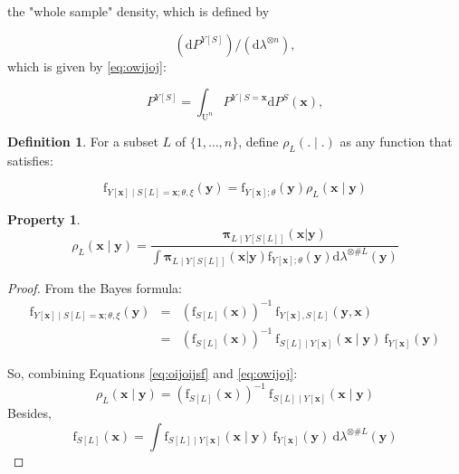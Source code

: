 \documentclass[12pt]{article}
\newtheorem{property}{Property}[section]
\theoremstyle{definition}
\newtheorem{definition}{Definition}[section]
\theoremstyle{remark}
\newcommand{\dominantY}{\lambda}
\newcommand{\sampledensity}{\mathbf{\pi}}
\newcommand{\parampop}{\theta}
\newcommand{\paramnuisance}{\xi}
\newcommand{\derive}{\mathrm{d}}
\newcommand{\density}{\mathrm{f}}
\newcommand{\Sample}{S}
\newcommand{\Pop}{\mathrm{U}}
\newcommand{\position}{\mathbf{x}}
\newcommand{\Sampleindex}{L}
\newcommand{\Signal}{Y}
\newcommand{\signal}{\mathbf{y}}
\begin{document}
the "whole sample" density, which is defined by


$$(\derive P^{\Signal[S]})/(\derive \dominantY^{\otimes n}),$$ which is given by \eqref{eq:owijoj}:

$$P^{\Signal[\Sample]}=\int_{\Pop^n} P^{\Signal\mid \Sample=\position}\derive P^\Sample(\position) ,$$


\begin{definition}
For a subset $\Sampleindex$ of $\{1,\ldots,n\}$,
define
$\rho_{\Sampleindex}(.\mid.)$ as any function that satisfies:

\begin{equation}
\density_{\Signal[\position]\mid\Sample[\Sampleindex]=\position ;\parampop,\paramnuisance}\left(\signal\right)=
    \density_{\Signal[\position];\parampop}\left(\signal\right)
    \rho_{\Sampleindex}\left(\position\mid  \signal\right)\label{eq:owijoj}
\end{equation}

\end{definition}


\begin{property}

\begin{equation}
\rho_{\Sampleindex}\left(\position \mid \signal\right)=
    \frac{\sampledensity_{\Sampleindex\mid \Signal[\Sample[\Sampleindex]]}\left(\position|\signal\right)}{\int
         \sampledensity_{\Sampleindex\mid \Signal[\Sample[\Sampleindex]]}\left(\position|\signal\right)
         \density_{\Signal[\position];\parampop}\left(\signal\right)
         \derive\dominantY^{\otimes\#\Sampleindex}\left(\signal\right)}
\end{equation}


\end{property}

\begin{proof}
From the Bayes formula:
\begin{eqnarray}
\density_{\Signal[\position]\mid\Sample[\Sampleindex]=\position ;\parampop,\paramnuisance}\left(\signal\right)
&=&(\density_{\Sample[\Sampleindex]}(\position))^{-1}~\density_{\Signal[\position],\Sample[\Sampleindex]}(\signal,\position)\\
&=&(\density_{\Sample[\Sampleindex]}(\position))^{-1}~
\density_{\Sample[\Sampleindex]\mid\Signal[\position]}(\position\mid \signal)~
\density_{\Signal[\position]}(\signal)\label{eq:oijoijsf}
\end{eqnarray}


So, combining Equations \eqref{eq:oijoijsf} and  \eqref{eq:owijoj}:
\begin{equation}
{\rho_{\Sampleindex}\left(\position \mid \signal\right)}
=(\density_{\Sample[\Sampleindex]}(\position))^{-1}
~\density_{\Sample[\Sampleindex]\mid\Signal[\position]}(\position\mid \signal)
\end{equation}
Besides,
\begin{equation}\label{eq:iurhiehgieurhg}
\density_{\Sample[\Sampleindex]}(\position)=
\int \density_{\Sample[\Sampleindex]\mid \Signal[\position]}(\position\mid \signal)~ \density_{\Signal[\position]}(\signal)~
\derive \dominantY^{\otimes \#\Sampleindex}(\signal)
\end{equation}
\end{proof}
\end{document}
